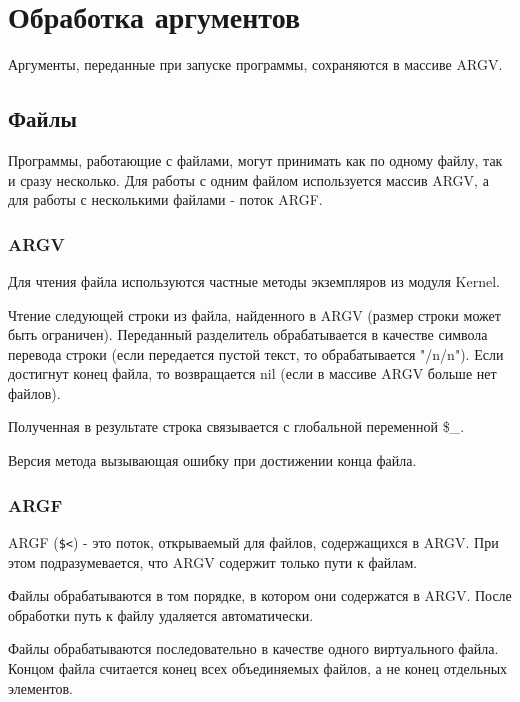 \chapter{Обработка аргументов}

Аргументы, переданные при запуске программы, сохраняются в массиве ARGV.

\section{Файлы}

Программы, работающие с файлами, могут принимать как по одному файлу, так и сразу несколько. Для работы с одним файлом используется массив ARGV, а для работы с несколькими файлами - поток ARGF.

\subsection{ARGV}

Для чтения файла используются частные методы экземпляров из модуля Kernel.

\begin{methodlist}
  Чтение следующей строки из файла, найденного в ARGV (размер строки может быть ограничен). Переданный разделитель обрабатывается в качестве символа перевода строки (если передается пустой текст, то обрабатывается "/n/n"). Если достигнут конец файла, то возвращается nil (если в массиве ARGV больше нет файлов).

  Полученная в результате строка связывается с глобальной переменной \$_. 
 
  Версия метода вызывающая ошибку при достижении конца файла. 
\end{methodlist}

\subsection{ARGF}

ARGF (\verb!$<!) - это поток, открываемый для файлов, содержащихся в ARGV. При этом подразумевается, что ARGV содержит только пути к файлам. 

Файлы обрабатываются в том порядке, в котором они содержатся в ARGV. После обработки путь к файлу удаляется автоматически.

Файлы обрабатываются последовательно в качестве одного виртуального файла. Концом файла считается конец всех объединяемых файлов, а не конец отдельных элементов. 

